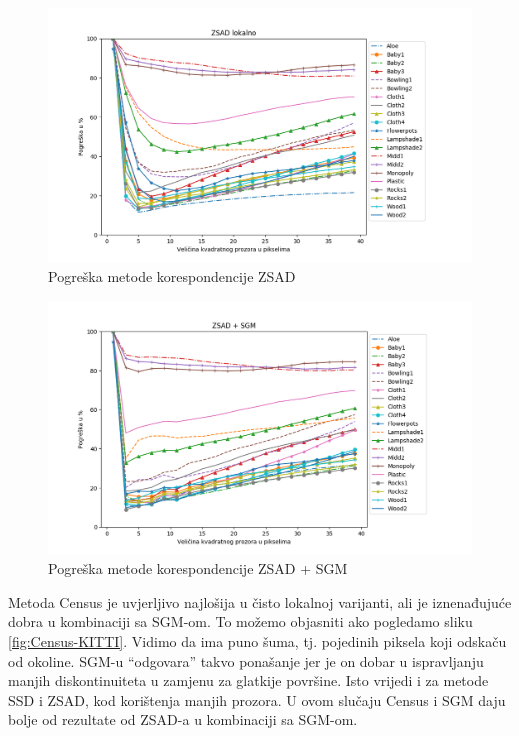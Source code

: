 \documentclass[utf8, zavrsni, numeric]{fer}
\begin{document}
\begin{figure}[H]
  \centering
  \includegraphics[width=13cm]{img/ZSAD_lokalno_middlebury.png}
  \caption{Pogreška metode korespondencije ZSAD}
  \label{fig:ZSAD-error}
\end{figure}

\begin{figure}[H]
  \centering
  \includegraphics[width=13cm]{img/ZSAD_sgm_middlebury.png}
  \caption{Pogreška metode korespondencije ZSAD + SGM}
  \label{fig:ZSAD-sgm-error}
\end{figure}

Metoda Census je uvjerljivo najlošija u čisto lokalnoj varijanti, ali je iznenađujuće dobra
u kombinaciji sa SGM-om. To možemo objasniti ako pogledamo sliku \ref{fig:Census-KITTI}.
Vidimo da ima puno šuma, tj. pojedinih piksela koji odskaču od okoline. SGM-u ``odgovara''
takvo ponašanje jer je on dobar u ispravljanju manjih diskontinuiteta u zamjenu za glatkije
površine. Isto vrijedi i za metode SSD i ZSAD, kod korištenja manjih prozora. U ovom
slučaju Census i SGM daju bolje od rezultate od ZSAD-a u kombinaciji sa SGM-om.
\end{document}

